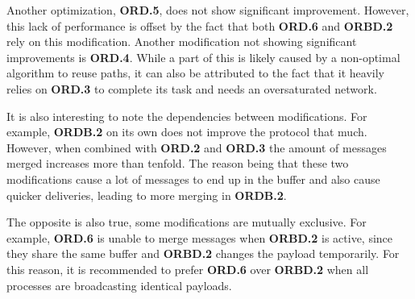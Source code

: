 Another optimization, \textbf{ORD.5}, does not show significant improvement. However, this lack of performance is offset by the fact that both \textbf{ORD.6} and \textbf{ORBD.2} rely on this modification. Another modification not showing significant improvements is \textbf{ORD.4}. While a part of this is likely caused by a non-optimal algorithm to reuse paths, it can also be attributed to the fact that it heavily relies on \textbf{ORD.3} to complete its task and needs an oversaturated network.

It is also interesting to note the dependencies between modifications. For example, \textbf{ORDB.2} on its own does not improve the protocol that much. However, when combined with \textbf{ORD.2} and \textbf{ORD.3} the amount of messages merged increases more than tenfold. The reason being that these two modifications cause a lot of messages to end up in the buffer and also cause quicker deliveries, leading to more merging in \textbf{ORDB.2}.

The opposite is also true, some modifications are mutually exclusive. For example, \textbf{ORD.6} is unable to merge messages when \textbf{ORBD.2} is active, since they share the same buffer and \textbf{ORBD.2} changes the payload temporarily. For this reason, it is recommended to prefer \textbf{ORD.6} over \textbf{ORBD.2} when all processes are broadcasting identical payloads. 

